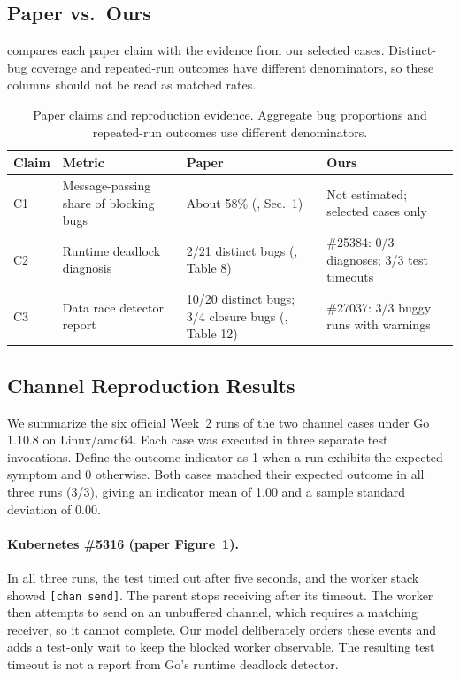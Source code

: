 \subsection{Paper vs.\ Ours}
 compares each paper claim with the evidence from
our selected cases. Distinct-bug coverage and repeated-run outcomes have
different denominators, so these columns should not be read as matched rates.
\begin{table}[H]
  \centering
  \caption{Paper claims and reproduction evidence. Aggregate bug
proportions and repeated-run outcomes use different denominators.}
  \label{tab:paper-vs-ours}
  \small
  \begin{tabularx}{\linewidth}{L{1.05cm}YYY}
    \toprule
    Claim & Metric & Paper & Ours \\
    \midrule
    C1 & Message-passing share of blocking bugs
       & About 58\% (\cite{tu2019go}, Sec.~1)
       & Not estimated; selected cases only \\
    C2 & Runtime deadlock diagnosis
       & 2/21 distinct bugs (\cite{tu2019go}, Table 8)
       & \#25384: 0/3 diagnoses; 3/3 test timeouts \\
    C3 & Data race detector report
       & 10/20 distinct bugs; 3/4 closure bugs (\cite{tu2019go}, Table 12)
       & \#27037: 3/3 buggy runs with warnings \\
    \bottomrule
  \end{tabularx}
\end{table}

\subsection{Channel Reproduction Results}
\label{sec:channel-results}

We summarize the six official Week~2 runs of the two channel cases
under Go 1.10.8 on Linux/amd64. Each case was executed in three separate
test invocations. Define the outcome indicator as 1 when a run exhibits
the expected symptom and 0 otherwise. Both cases matched their expected
outcome in all three runs (3/3), giving an indicator mean of 1.00 and a
sample standard deviation of 0.00.

\paragraph{Kubernetes \#5316 (paper Figure~1).}
In all three runs, the test timed out after five seconds, and the worker
stack showed \texttt{[chan send]}. The parent stops receiving after its
timeout. The worker then attempts to send on an unbuffered channel,
which requires a matching receiver, so it cannot complete.
Our model deliberately orders these events and adds a test-only wait
to keep the blocked worker observable. The resulting test timeout is
not a report from Go's runtime deadlock detector.

